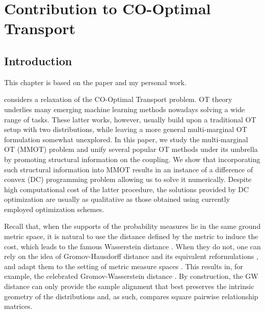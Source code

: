 
\chapter[Contribution to CO-Optimal Transport]{Contribution to CO-Optimal Transport}

\localtableofcontents*


\section{Introduction}

This chapter is based on the paper \citep{Tran21} and my personal work.


considers a relaxation of the
CO-Optimal Transport problem. OT theory underlies many emerging machine learning
methods nowadays solving a wide range of tasks.
These latter works, however, usually build upon a traditional OT setup with two distributions,
while leaving a more general multi-marginal OT formulation somewhat
unexplored. In this paper, we study the multi-marginal OT (MMOT) problem and unify several
popular OT methods under its umbrella
by promoting structural information on the coupling. We show that incorporating such structural
information into MMOT results in an instance of a difference of convex (DC) programming problem allowing us to solve it numerically.
Despite high computational cost of the latter procedure, the solutions provided by DC optimization are usually as qualitative as
those obtained using currently employed optimization schemes.

Recall that, when the supports of the probability measures lie in the same ground metric space,
it is natural to use the distance defined by the metric
to induce the cost, which leads to the famous Wasserstein distance \citep{Villani03}.
When they do not, one can rely on the idea of Gromov-Hausdorff distance \citep{Gromov81}
and its equivalent reformulations \citep{Gromov99,Kalton99,Burago01},
and adapt them to the setting of metric measure spaces \citep{Gromov99}.
This results in, for example, the celebrated Gromov-Wasserstein distance
\citep{Memoli07,Memoli11,Sturm12}. By construction, the GW distance can only provide
the sample alignment that best preserves the intrinsic geometry of the distributions and,
as such, compares square pairwise relationship matrices.

